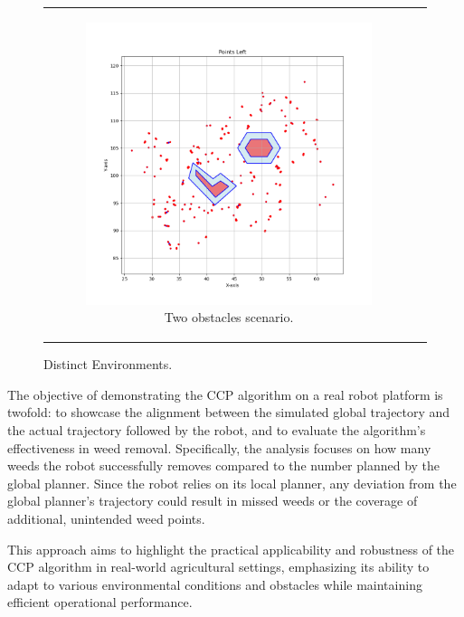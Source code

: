 \begin{figure}[H]
\begin{tabular}{cc}
\begin{subfigure}{0.4\textwidth}
            \includegraphics[width=\textwidth]{Images/real_robot/obs_scene.png}
            \caption{Two obstacles scenario.}
        \end{subfigure}
    \end{tabular}
    \caption{Distinct Environments.\label{fig:two_obs_scenario}} 
\end{figure}


\vspace*{6mm}   


The objective of demonstrating the CCP algorithm on a real robot platform is twofold: to showcase the alignment between the simulated global trajectory and the actual trajectory followed by the robot, and to evaluate the algorithm's effectiveness in weed removal. Specifically, the analysis focuses on how many weeds the robot successfully removes compared to the number planned by the global planner. Since the robot relies on its local planner, any deviation from the global planner's trajectory could result in missed weeds or the coverage of additional, unintended weed points.

\vspace*{6mm}   


This approach aims to highlight the practical applicability and robustness of the CCP algorithm in real-world agricultural settings, emphasizing its ability to adapt to various environmental conditions and obstacles while maintaining efficient operational performance.

